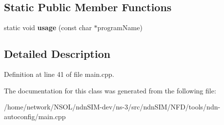 \subsection*{Static Public Member Functions}
\begin{DoxyCompactItemize}
\item 
static void {\bfseries usage} (const char $\ast$program\+Name)\hypertarget{classndn_1_1tools_1_1NdnAutoconfig_acb4a1d4c3e363ccb5a0b0bf45c611569}{}\label{classndn_1_1tools_1_1NdnAutoconfig_acb4a1d4c3e363ccb5a0b0bf45c611569}

\end{DoxyCompactItemize}


\subsection{Detailed Description}


Definition at line 41 of file main.\+cpp.



The documentation for this class was generated from the following file\+:\begin{DoxyCompactItemize}
\item 
/home/network/\+N\+S\+O\+L/ndn\+S\+I\+M-\/dev/ns-\/3/src/ndn\+S\+I\+M/\+N\+F\+D/tools/ndn-\/autoconfig/main.\+cpp\end{DoxyCompactItemize}
